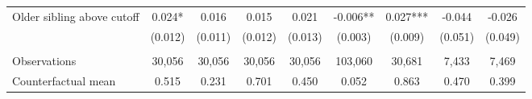 {{\begin{tabular}{lcccccccc}
Older sibling above cutoff&       0.024*  &       0.016   &       0.015   &       0.021   &      -0.006** &       0.027***&      -0.044   &      -0.026   \\
                    &     (0.012)   &     (0.011)   &     (0.012)   &     (0.013)   &     (0.003)   &     (0.009)   &     (0.051)   &     (0.049)   \\
                    &               &               &               &               &               &               &               &               \\
Observations        &      30,056   &      30,056   &      30,056   &      30,056   &     103,060   &      30,681   &       7,433   &       7,469   \\
Counterfactual mean &       0.515   &       0.231   &       0.701   &       0.450   &       0.052   &       0.863   &       0.470   &       0.399   \\
 

\bottomrule
\end{tabular}
}
}
